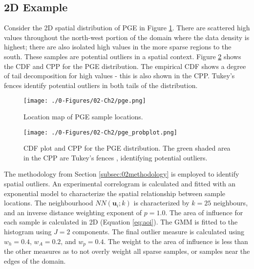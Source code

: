\FloatBarrier
\subsection{2D Example}
\label{subsec:02example2D}

Consider the \gls{2D} spatial distribution of \gls{PGE} in Figure \ref{fig:pge}. There are scattered high values throughout the north-west portion of the domain where the data density is highest; there are also isolated high values in the more sparse regions to the south. These samples are potential outliers in a spatial context. Figure \ref{fig:pge_probplot} shows the \gls{CDF} and \gls{CPP} for the \gls{PGE} distribution. The empirical \gls{CDF} shows a degree of tail decomposition for high values - this is also shown in the \gls{CPP}. Tukey's fences \citep{tukey1977exploratory} identify potential outliers in both tails of the distribution.

\begin{figure}[htb!]
    \centering
    \texttt{[image: ./0-Figures/02-Ch2/pge.png]}
    \caption{Location map of \gls{PGE} sample locations. }
    \label{fig:pge}
\end{figure}

\begin{figure}[htb!]
    \centering
    \texttt{[image: ./0-Figures/02-Ch2/pge\_probplot.png]}
    \caption{\Gls{CDF} plot and \gls{CPP} for the \gls{PGE} distribution. The green shaded area in the \gls{CPP} are Tukey's fences \citep{tukey1977exploratory}, identifying potential outliers. }
    \label{fig:pge_probplot}
\end{figure}

The methodology from Section \ref{subsec:02methodology} is employed to identify spatial outliers. An experimental correlogram is calculated and fitted with an exponential model to characterize the spatial relationship between sample locations. The neighbourhood $NN(\mathbf{u}_{i}; k)$ is characterized by $k=25$ neighbours, and an inverse distance weighting exponent of $p=1.0$. The area of influence for each sample is calculated in \gls{2D} (Equation \ref{eq:aoi}). The \gls{GMM} is fitted to the histogram using $J=2$ components. The final outlier measure is calculated using $w_{h}=0.4$, $w_{A}=0.2$, and $w_{p}=0.4$. The weight to the area of influence is less than the other measures as to not overly weight all sparse samples, or samples near the edges of the domain.

